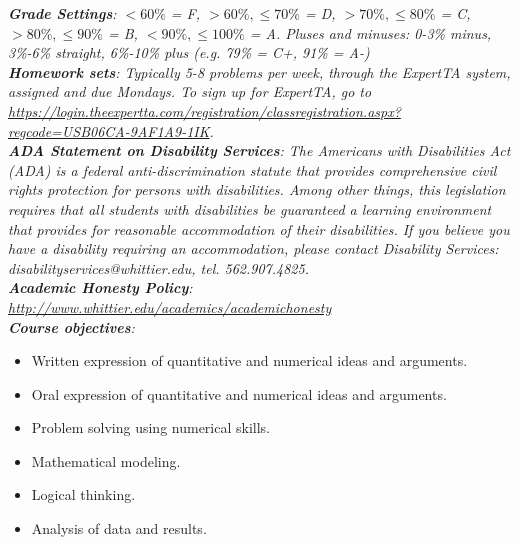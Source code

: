 \documentclass[10pt]{article}
\begin{document}
\textit{\textbf{Grade Settings}: $<60\%$ = F, $>60\%,\leq 70\%$ = D, $>70\%,\leq80\%$ = C, $>80\%,\leq 90\%$ = B, $<90\%,\leq 100\%$ = A.  Pluses and minuses: 0-3\% minus, 3\%-6\% straight, 6\%-10\% plus (e.g. 79\% = C+, 91\% = A-)} \\
\textit{\textbf{Homework sets}: Typically 5-8 problems per week, through the ExpertTA system, assigned and due Mondays.  To sign up for ExpertTA, go to \\ \url{https://login.theexpertta.com/registration/classregistration.aspx?regcode=USB06CA-9AF1A9-1IK}.} \\
\textit{\textbf{ADA Statement on Disability Services}: The Americans with Disabilities Act (ADA) is a federal anti-discrimination statute that provides comprehensive civil rights protection for persons with disabilities. Among other things, this legislation requires that all students with disabilities be guaranteed a learning environment that provides for reasonable accommodation of their disabilities. If you believe you have a disability requiring an accommodation, please contact Disability Services: disabilityservices@whittier.edu, tel. 562.907.4825.} \\
\textit{\textbf{Academic Honesty Policy}: \url{http://www.whittier.edu/academics/academichonesty}} \\
\textit{\textbf{Course objectives}:}
\begin{itemize}
\item Written expression of quantitative and numerical ideas and arguments.
\item Oral expression of quantitative and numerical ideas and arguments.
\item Problem solving using numerical skills.
\item Mathematical modeling.
\item Logical thinking.
\item Analysis of data and results.
\end{itemize}
\clearpage
\end{document}
